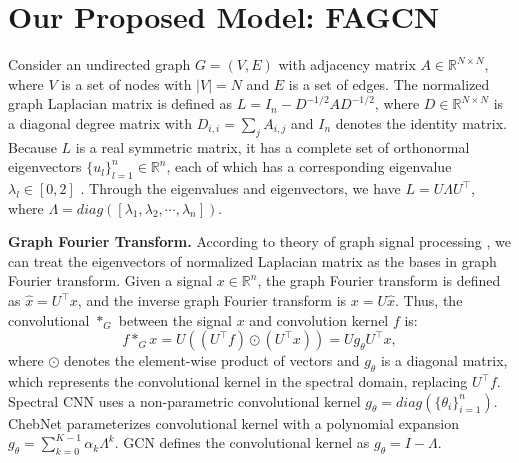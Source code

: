 \documentclass[letterpaper]{article} %
\begin{document}
\section{Our Proposed Model: FAGCN}
\label{separation}

Consider an undirected graph $G=(V, E)$ with adjacency matrix $A \in \mathbb{R}^{N \times N}$, where $V$ is a set of nodes with $\left| V \right| = N$ and $E$ is a set of edges. The normalized graph Laplacian matrix is defined as $L=I_{n}-D^{-1/2}AD^{-1/2}$, where $D \in \mathbb{R}^{N \times N}$ is a diagonal degree matrix with $D_{i,i}=\sum_{j}A_{i,j}$ and $I_{n}$ denotes the identity matrix. Because $L$ is a real symmetric matrix, it has a complete set of orthonormal eigenvectors $\{u_{l}\}_{l=1}^{n} \in \mathbb{R}^{n}$, each of which has a corresponding eigenvalue $\lambda_{l} \in [0, 2]$ \cite{spectralgraph}. Through the eigenvalues and eigenvectors, we have $L=U\Lambda U^{\top}$, where $\Lambda=diag([ \lambda_{1},\lambda_{2},\cdots,\lambda_{n} ])$.

\textbf{Graph Fourier Transform.}
According to theory of graph signal processing \cite{GSP}, we can treat the eigenvectors of normalized Laplacian matrix as the bases in graph Fourier transform. Given a signal $x \in \mathbb{R}^{n}$, the graph Fourier transform is defined as $\hat{x}=U^{\top}x$, and the inverse graph Fourier transform is $x=U\hat{x}$. Thus, the convolutional $*_{G}$ between the signal $x$ and convolution kernel $f$ is:
\begin{equation}
\label{convolution}
	f *_{G} x = U \left( \left( U^{\top}f \right) \odot \left( U^{\top}x \right) \right) = Ug_{\theta}U^{\top}x,
\end{equation}
where $\odot$ denotes the element-wise product of vectors and $g_{\theta}$ is a diagonal matrix, which represents the convolutional kernel in the spectral domain, replacing $U^{\top}f$. Spectral CNN \cite{SpectralCNN} uses a non-parametric convolutional kernel $g_{\theta}=diag(\{ \theta_{i} \}_{i=1}^{n})$. ChebNet \cite{ChebNet} parameterizes convolutional kernel with a polynomial expansion $g_{\theta}=\sum_{k=0}^{K-1}\alpha_{k}\Lambda^{k}$. GCN defines the convolutional kernel as $g_{\theta}=I-\Lambda$.
\end{document}
